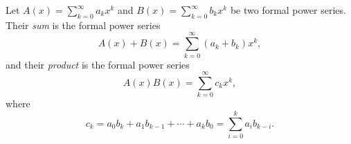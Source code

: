 

\setcounter{section}{2}
\setcounter{subsection}{2}
\setcounter{dfn}{1}

\begin{dfn}
Let $A(x) = \sum_{k=0}^\infty a_k x^k$ and $B(x) = \sum_{k=0}^\infty b_k x^k$ be two formal power series.
Their \emph{sum} is the formal power series
\[
A(x) + B(x) = \sum_{k=0}^\infty (a_k + b_k)x^k,
\]
and their \emph{product} is the formal power series
\[
A(x)B(x) = \sum_{k=0}^\infty c_k x^k,
\]
where
\[
c_k = a_0b_k + a_1b_{k-1} + \cdots + a_kb_0 = \sum_{i=0}^k a_i b_{k-i}.
\]
\end{dfn}

